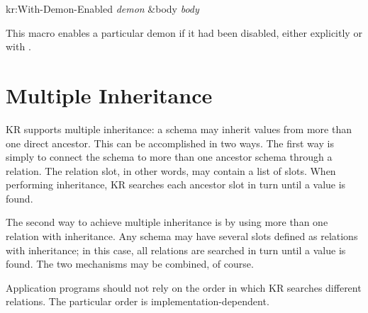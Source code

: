 \value{f-top}
\begin{example}
kr:With-Demon-Enabled {\it demon} \&body {\it body}\value{macro}
\end{example}

This macro enables a particular demon if it had been disabled, either
explicitly or with .





\section{Multiple Inheritance}
\value{s-top}

KR supports multiple inheritance: a schema
may inherit values from more than one direct ancestor.  This can be
accomplished in two ways.  The first way is simply to connect the
schema to more than one ancestor schema through a relation.  The
relation slot, in other words, may contain a list of slots.  When
performing inheritance, KR searches each ancestor slot in turn until a
value is found.

The second way to achieve multiple inheritance is by using more than one
relation with inheritance.  Any schema may have several slots defined as
relations with inheritance; in this case, all relations are searched in
turn until a value is found.  The two mechanisms may be combined, of
course.

Application programs should not rely on the order in which KR searches
different relations.  The particular order is implementation-dependent.




